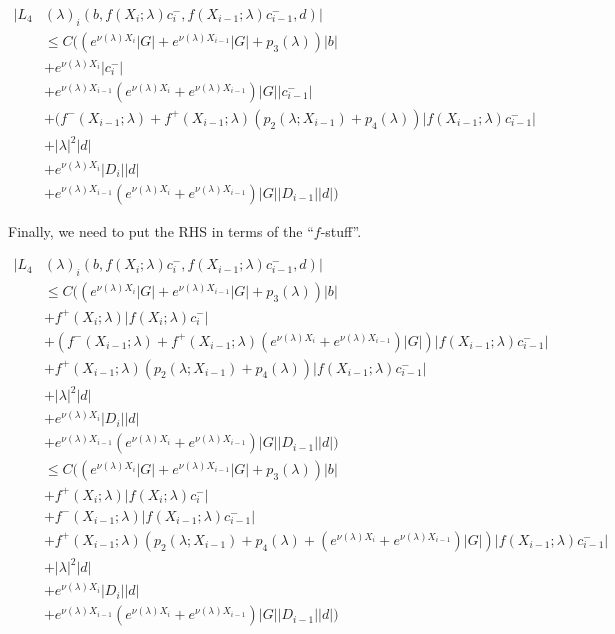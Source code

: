 \documentclass[12pt]{article}
\begin{document}
\begin{enumerate}
\begin{align*}
|L_4&(\lambda)_i(b, f(X_i; \lambda) c_i^-, f(X_{i-1}; \lambda) c_{i-1}^-, d)|\\ 
&\leq C\Big( 
(e^{\nu(\lambda)X_i} |G| + e^{\nu(\lambda)X_{i-1}} |G| + p_3(\lambda)) |b| \\
&+ e^{\nu(\lambda)X_i} |c_i^-| \\
&+ e^{\nu(\lambda)X_{i-1}} (e^{\nu(\lambda)X_i} + e^{\nu(\lambda)X_{i-1}}) |G| |c_{i-1}^-| \\
&+ (f^-(X_{i-1}; \lambda) + f^+(X_{i-1}; \lambda) (p_2(\lambda; X_{i-1}) + p_4(\lambda)) | f(X_{i-1}; \lambda) c_{i-1}^-| \\
&+ |\lambda|^2 |d| \\ 
&+ e^{\nu(\lambda)X_i} |D_i||d| \\
&+ e^{\nu(\lambda)X_{i-1}} (e^{\nu(\lambda)X_i} + e^{\nu(\lambda)X_{i-1}}) |G| |D_{i-1}||d| \Big)
\end{align*}

Finally, we need to put the RHS in terms of the ``$f$-stuff''.

\begin{align*}
|L_4&(\lambda)_i(b, f(X_i; \lambda) c_i^-, f(X_{i-1}; \lambda) c_{i-1}^-, d)|\\ 
&\leq C\Big( 
(e^{\nu(\lambda)X_i} |G| + e^{\nu(\lambda)X_{i-1}} |G| + p_3(\lambda)) |b| \\
&+ f^+(X_i; \lambda) |f(X_i; \lambda) c_i^-| \\
&+ (f^-(X_{i-1}; \lambda) + f^+(X_{i-1}; \lambda)(e^{\nu(\lambda)X_i} + e^{\nu(\lambda)X_{i-1}}) |G|) |f(X_{i-1}; \lambda)c_{i-1}^-| \\
&+ f^+(X_{i-1}; \lambda) (p_2(\lambda; X_{i-1}) + p_4(\lambda)) | f(X_{i-1}; \lambda) c_{i-1}^-| \\
&+ |\lambda|^2 |d| \\ 
&+ e^{\nu(\lambda)X_i} |D_i||d| \\
&+ e^{\nu(\lambda)X_{i-1}} (e^{\nu(\lambda)X_i} + e^{\nu(\lambda)X_{i-1}}) |G| |D_{i-1}||d| \Big)\\
&\leq C\Big( 
(e^{\nu(\lambda)X_i} |G| + e^{\nu(\lambda)X_{i-1}} |G| + p_3(\lambda)) |b| \\
&+ f^+(X_i; \lambda) |f(X_i; \lambda) c_i^-| \\
&+ f^-(X_{i-1}; \lambda)|f(X_{i-1}; \lambda)c_{i-1}^-| \\
&+ f^+(X_{i-1}; \lambda) (p_2(\lambda; X_{i-1}) + p_4(\lambda) + (e^{\nu(\lambda)X_i} + e^{\nu(\lambda)X_{i-1}}) |G|) | f(X_{i-1}; \lambda) c_{i-1}^-| \\
&+ |\lambda|^2 |d| \\ 
&+ e^{\nu(\lambda)X_i} |D_i||d| \\
&+ e^{\nu(\lambda)X_{i-1}} (e^{\nu(\lambda)X_i} + e^{\nu(\lambda)X_{i-1}}) |G| |D_{i-1}||d| \Big)
\end{align*}


\end{enumerate}
\end{document}
